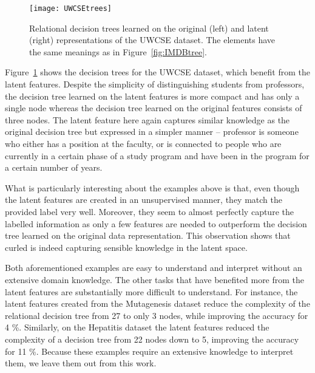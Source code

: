 \begin{figure}[t]
	\centering
	\medskip
	\texttt{[image: UWCSEtrees]}
    \caption[Explanation of the latent features invented for the UWCSE dataset]{Relational decision trees learned on the original (left) and latent (right) representations of the UWCSE dataset. The elements have the same meanings as in Figure~\ref{fig:IMDBtree}. }
    \label{fig:UWCSEtree}
\end{figure}



Figure~\ref{fig:UWCSEtree} shows the decision trees for the UWCSE dataset, which benefit from the latent features.
Despite the simplicity of distinguishing students from professors, the decision tree learned on the latent features is more compact and has only a single node whereas the decision tree learned on the original features consists of three nodes.
The latent feature here again captures similar knowledge as the original decision tree but expressed in a simpler manner -- professor is someone who either has a position at the faculty, or is connected to people who are currently in a certain phase of a study program and have been in the program for a certain number of years.




What is particularly interesting about the examples above is that, even though the latent features are created in an unsupervised manner, they match the provided label very well.
Moreover, they seem to almost perfectly capture the labelled information as only a few features are needed to outperform the decision tree learned on the original data representation.
This observation shows that \gls{curled} is indeed capturing sensible knowledge in the latent space.



Both aforementioned examples are easy to understand and interpret without an extensive domain knowledge.
The other tasks that have benefited more from the latent features are substantially more difficult to understand.
For instance, the latent features created from the Mutagenesis dataset reduce the complexity of the relational decision tree from 27 to only 3 nodes, while improving the accuracy for 4 \%.
Similarly, on the Hepatitis dataset the latent features reduced the complexity of a decision tree from 22 nodes down to 5, improving the accuracy for 11 \%.
Because these examples require an extensive knowledge to interpret them, we leave them out from this work.



